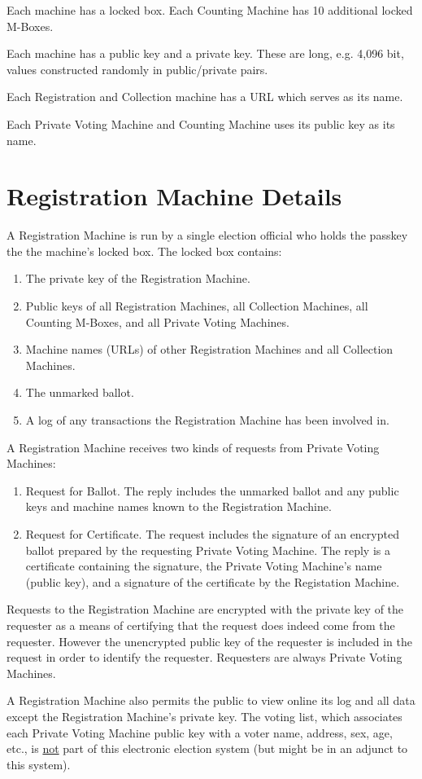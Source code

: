 \documentclass[12pt]{article}
\begin{document}
Each machine has a locked box.  Each Counting
Machine has 10 additional locked M-Boxes.

Each machine has a public key and a private key.  These
are long, e.g. 4,096 bit, values constructed randomly
in public/private pairs.

Each Registration and Collection
machine has a URL which serves as its name.

Each Private Voting Machine and Counting Machine uses its
public key as its name.

\section{Registration Machine Details}

A Registration Machine is run by a single election official
who holds the passkey the the machine's locked box.  The
locked box contains:
\begin{enumerate}
\item The private key of the Registration Machine.
\item Public keys of all Registration Machines, all Collection
Machines, all Counting M-Boxes, and all Private Voting Machines.
\item Machine names (URLs) of other Registration Machines and all Collection
Machines.
\item The unmarked ballot.
\item A log of any transactions the Registration Machine has
been involved in.
\end{enumerate}

A Registration Machine receives two kinds of requests from
Private Voting Machines:
\begin{enumerate}

\item
Request for Ballot.  The reply includes the unmarked ballot
and any public keys and machine names known to the Registration
Machine.

\item
Request for Certificate.  The request includes the signature
of an encrypted ballot prepared by the requesting Private
Voting Machine.  The reply is a certificate containing
the signature, the Private Voting Machine's name (public key),
and a signature of the certificate by the Registation Machine.

\end{enumerate}

Requests to the Registration Machine are encrypted with the
private key of the requester as a means of certifying that
the request does indeed come from the requester.  However the
unencrypted public key of the requester is included in the
request in order to identify the requester.  Requesters are
always Private Voting Machines.

A Registration Machine also permits the public to view online
its log and all data except the Registration Machine's
private key.  The voting list, which associates each Private
Voting Machine public key with a voter name, address, sex,
age, etc., is \underline{not} part of this electronic
election system (but might be in an adjunct to this system).
\end{document}
